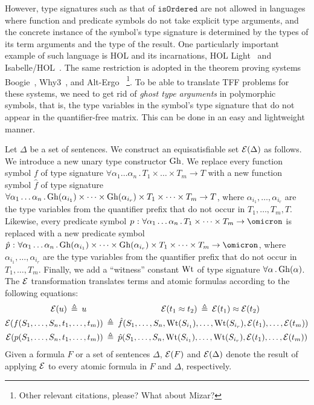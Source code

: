 However, type signatures such as that of $\mathtt{isOrdered}$ are not
allowed in languages where function and predicate symbols do not take
explicit type arguments, and the concrete instance of the symbol's type
signature is determined by the types of its term arguments and the type
of the result.
One particularly important example of such language is HOL
and its incarnations, HOL Light~\cite{harrison09hollight}
and Isabelle/HOL~\cite{NipkowPaulsonWenzel2002Isabelle}.
The same restriction is adopted in the theorem proving systems
Boogie~\cite{Barnett06boogie}, Why3~\cite{boogie11why3}, and
Alt-Ergo~\cite{conchon08smt}%
\footnote{Other relevant citations, please? What about Mizar?}.
To be able to translate TFF problems for these systems, we need
to get rid of {\em ghost type arguments} in polymorphic symbols,
that is, the type variables in the symbol's type signature that
do not appear in the quantifier-free matrix.
This can be done in an easy and lightweight manner.

Let $\Delta$ be a set of sentences.
We construct an equisatisfiable set $\mathcal{E}(\Delta)$ as follows.
%
We introduce a new unary type constructor $\mathrm{Gh}$.
We replace every function symbol $f$ of type signature
$\forall \alpha_1\dots\alpha_n \,.\, T_1 \times \dots \times T_m \to T$
with a new function symbol $\hat{f}$ of type signature
$\forall \alpha_1\dots\alpha_n \,.\,
\mathrm{Gh}(\alpha_{i_1}) \times \dots \times \mathrm{Gh}(\alpha_{i_r}) \times
T_1 \times \dots \times T_m \to T$,
where $\alpha_{i_1},\dots,\alpha_{i_r}$ are the type
variables from the quantifier prefix that do not occur in
$T_1,\dots,T_m,T$.
Likewise, every predicate symbol $p \,\ty\,
\forall \alpha_1\dots\alpha_n \,.\, T_1 \times \dots \times T_m \to \omicron$
is replaced with a new predicate symbol $\hat{p} \,\ty\,
\forall \alpha_1\dots\alpha_n \,.\,
\ghost(\alpha_{i_1}) \times \dots \times \ghost(\alpha_{i_r}) \times
T_1 \times \dots \times T_m \to \omicron$,
where $\alpha_{i_1},\dots,\alpha_{i_r}$ are the type
variables from the quantifier prefix that do not occur in
$T_1,\dots,T_m$.
Finally, we add a ``witness'' constant $\mathrm{Wt}$
of type signature $\forall \alpha\,.\,\mathrm{Gh}(\alpha)$.
The $\mathcal{E}$ transformation translates terms and atomic
formulas according to the following equations:
\begin{align*}
\mathcal{E}(u) \:\triangleq\: u
\quad\quad & \qquad\qquad\qquad\quad
\mathcal{E}(t_1 \approx t_2) \:\triangleq\: \mathcal{E}(t_1) \approx \mathcal{E}(t_2) \\
\mathcal{E}(f(S_1,\dots,S_n,t_1,\dots,t_m)) &\:\triangleq\:
\hat{f}(S_1,\dots,S_n,\mathrm{Wt}(S_{i_1}),\dots,\mathrm{Wt}(S_{i_r}),
\mathcal{E}(t_1),\dots,\mathcal{E}(t_m)) \\
\mathcal{E}(p(S_1,\dots,S_n,t_1,\dots,t_m)) &\:\triangleq\:
\hat{p}(S_1,\dots,S_n,\mathrm{Wt}(S_{i_1}),\dots,\mathrm{Wt}(S_{i_r}),
\mathcal{E}(t_1),\dots,\mathcal{E}(t_m))
\end{align*}
Given a formula $F$ or a set of sentences $\Delta$,
$\mathcal{E}(F)$ and $\mathcal{E}(\Delta)$ denote the result of
applying $\mathcal{E}$ to every atomic formula in $F$ and
$\Delta$, respectively.


